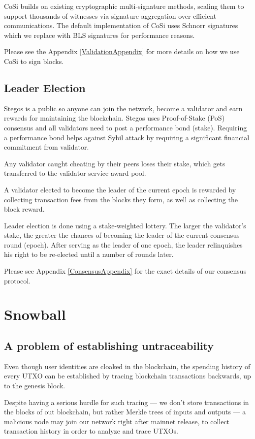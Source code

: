 \documentclass[a4paper, 10pt, conference]{ieeeconf}
\begin{document}
CoSi builds on existing cryptographic multi-signature methods, scaling them to support thousands of witnesses via signature aggregation over efficient communications. The default implementation of CoSi uses Schnorr signatures which we replace with BLS signatures for performance reasons.

Please see the Appendix \ref{ValidationAppendix} for more details on how we use CoSi to sign blocks.

\subsection{Leader Election}
Stegos is a public so anyone can join the network, become a validator and earn rewards for maintaining the blockchain. Stegos uses Proof-of-Stake (PoS) consensus and all validators need to post a performance bond (stake). Requiring a performance bond helps against Sybil attack by requiring a significant financial commitment from validator.

Any validator caught cheating by their peers loses their stake, which gets transferred to the validator service award pool. 

A validator elected to become the leader of the current epoch is rewarded by collecting transaction fees from the blocks they form, as well as collecting the block reward. 

Leader election is done using a stake-weighted lottery. The larger the validator's stake, the greater the chances of becoming the leader of the current consensus round (epoch). After serving as the leader of one epoch, the leader relinquishes his right to be re-elected until a number of rounds later.

Please see Appendix \ref{ConsensusAppendix} for the exact details of our consensus protocol.

\section{Snowball}\label{Snowball}

\subsection{A problem of establishing untraceability}
Even though user identities are cloaked in the blockchain, the spending history of every UTXO can be established by tracing blockchain transactions backwards, up to the genesis block.

Despite having a serious hurdle for such tracing --- we don't store transactions in the blocks of out blockchain, but rather Merkle trees of inputs and outputs --- a malicious node may join our network right after mainnet release, to collect transaction history in order to analyze and trace UTXOs.
\end{document}
